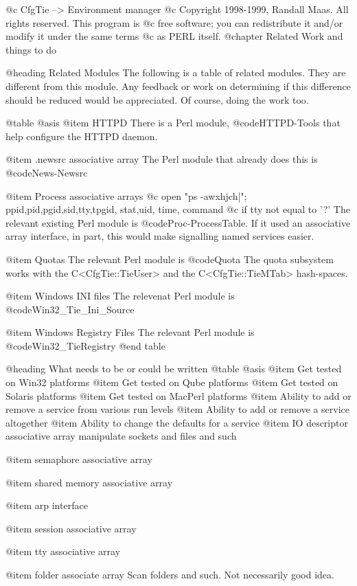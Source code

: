 @c CfgTie --> Environment manager
@c Copyright 1998-1999, Randall Maas.  All rights reserved.  This program is
@c free software; you can redistribute it and/or modify it under the same terms
@c as PERL itself.                                                                   
@chapter Related Work and things to do

@heading Related Modules
The following is a table of related modules.  They are different from this
module.  Any feedback or work on determining if this difference should be
reduced would be appreciated.  Of course, doing the work too.

@table @asis
@item HTTPD
There is a Perl module, @code{HTTPD-Tools} that help configure the HTTPD
daemon.

@item .newsrc associative array
The Perl module that already does this is @code{News-Newsrc}

@item Process associative arrays
@c open "ps -awxhjch|"; ppid,pid,pgid,sid,tty,tpgid, stat,uid, time, command
@c if tty not equal to '?'
The relevant existing Perl module is @code{Proc-ProcessTable}.
If it used an associative array interface, in part, this would make
signalling named services easier.

@item Quotas
The relevant Perl module is @code{Quota}
The quota subsystem works with the C<CfgTie::TieUser> and the
C<CfgTie::TieMTab> hash-spaces.

@item Windows INI files
The relevenat Perl module is @code{Win32_Tie_Ini_Source}

@item Windows Registry Files
The relevant Perl module is @code{Win32_TieRegistry}
@end table

@heading What needs to be or could be written
@table @asis
@item Get tested on Win32 platforms
@item Get tested on Qube platforms
@item Get tested on Solaris platforms
@item Get tested on MacPerl platforms
@item Ability to add or remove a service from various run levels
@item Ability to add or remove a service altogether
@item Ability to change the defaults for a service
@item IO descriptor associative array
manipulate sockets and files and such

@item semaphore associative array

@item shared memory associative array

@item arp interface

@item session associative array

@item tty associative array

@item folder associate array
Scan folders and such.  Not necessarily good idea.

